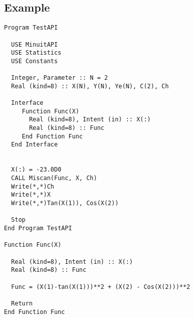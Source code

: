 \subsection{Example}

\begin{lstlisting}[emph=Minimize,
                   emphstyle=\color{blue},
                   frame=trBL,
                   caption=Using minuit library to minimize a function.,
                   label=minimize]
Program TestAPI

  USE MinuitAPI
  USE Statistics
  USE Constants

  Integer, Parameter :: N = 2
  Real (kind=8) :: X(N), Y(N), Ye(N), C(2), Ch

  Interface 
     Function Func(X)
       Real (kind=8), Intent (in) :: X(:)
       Real (kind=8) :: Func
     End Function Func
  End Interface
  

  X(:) = -23.0D0
  CALL Miscan(Func, X, Ch)
  Write(*,*)Ch
  Write(*,*)X
  Write(*,*)Tan(X(1)), Cos(X(2))

  Stop
End Program TestAPI

Function Func(X)

  Real (kind=8), Intent (in) :: X(:)
  Real (kind=8) :: Func

  Func = (X(1)-tan(X(1)))**2 + (X(2) - Cos(X(2)))**2

  Return
End Function Func
\end{lstlisting}






